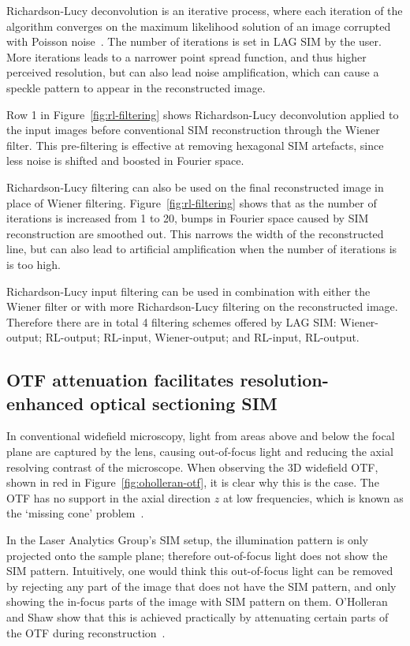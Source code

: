 Richardson-Lucy deconvolution is an iterative process, where each iteration of the algorithm converges on the maximum likelihood solution of an image corrupted with Poisson noise~\cite{richardson1972bayesian, lucy1974iterative}. 
The number of iterations is set in LAG SIM by the user.
More iterations leads to a narrower point spread function, and thus higher perceived resolution, but can also lead noise amplification, which can cause a speckle pattern to appear in the reconstructed image.  

Row 1 in Figure~\ref{fig:rl-filtering} shows Richardson-Lucy deconvolution applied to the input images before conventional SIM reconstruction through the Wiener filter. 
This pre-filtering is effective at removing hexagonal SIM artefacts, since less noise is shifted and boosted in Fourier space.

Richardson-Lucy filtering can also be used on the final reconstructed image in place of Wiener filtering. 
Figure~\ref{fig:rl-filtering} shows that as the number of iterations is increased from 1 to 20, bumps in Fourier space caused by SIM reconstruction are smoothed out. 
This narrows the width of the reconstructed line, but can also lead to artificial amplification when the number of iterations is is too high. 

Richardson-Lucy input filtering can be used in combination with either the Wiener filter or with more Richardson-Lucy filtering on the reconstructed image. 
Therefore there are in total 4 filtering schemes offered by LAG SIM: Wiener-output; RL-output; RL-input, Wiener-output; and RL-input, RL-output. 

\subsection{OTF attenuation facilitates resolution-enhanced optical sectioning SIM}
In conventional widefield microscopy, light from areas above and below the focal plane are captured by the lens, causing out-of-focus light and reducing the axial resolving contrast of the microscope. 
When observing the 3D widefield OTF, shown in red in Figure~\ref{fig:oholleran-otf}, it is clear why this is the case. 
The OTF has no support in the axial direction $z$ at low frequencies, which is known as the `missing cone' problem~\cite{sheppard1992significance}. 

In the Laser Analytics Group's SIM setup, the illumination pattern is only projected onto the sample plane; therefore out-of-focus light does not show the SIM pattern.
Intuitively, one would think this out-of-focus light can be removed by rejecting any part of the image that does not have the SIM pattern, and only showing the in-focus parts of the image with SIM pattern on them. 
O'Holleran and Shaw show that this is achieved practically by attenuating certain parts of the OTF during reconstruction~\cite{oholleran2014optimized}.

